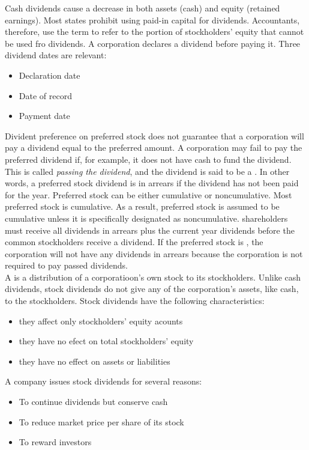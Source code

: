 \documentclass{article}
\begin{document}
Cash dividends cause a decrease in both assets (cash) and equity (retained earnings). Most states prohibit using paid-in capital for dividends. Accountants, therefore, use the term  to refer to the portion of stockholders' equity that cannot be used fro dividends. A corporation declares a dividend before paying it. Three dividend dates are relevant:
\begin{itemize}
  \item Declaration date 
  \item Date of record 
  \item Payment date 
\end{itemize}

Divident preference on preferred stock does not guarantee that a corporation will pay a dividend equal to the preferred amount. A corporation may fail to pay the preferred dividend if, for example, it does not have cash to fund the dividend. This is called \emph{passing the dividend}, and the dividend is said to be a . In other words, a preferred stock dividend is in arrears if the dividend has not been paid for the year. Preferred stock can be either cumulative or noncumulative. Most preferred stock is cumulative. As a result, preferred stock is assumed to be cumulative unless it is specifically designated as noncumulative.  shareholders must receive all dividends in arrears plus the current year dividends before the common stockholders receive a dividend. If the preferred stock is , the corporation will not have any dividends in arrears because the corporation is not required to pay passed dividends.  \\ 

A  is a distribution of a corporatioon's own stock to its stockholders. Unlike cash dividends, stock dividends do not give any of the corporation's assets, like cash, to the stockholders. Stock dividends have the following characteristics: 
\begin{itemize}
  \item they affect only stockholders' equity acounts 
  \item they have no efect on total stockholders' equity 
  \item they have no effect on assets or liabilities
\end{itemize}

A company issues stock dividends for several reasons: 
\begin{itemize}
  \item To continue dividends but conserve cash 
  \item To reduce market price per share of its stock 
  \item To reward investors 
\end{itemize}
\end{document}
